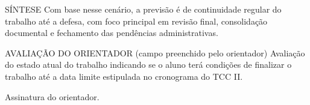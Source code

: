 \documentclass[12pt,a4paper]{article}
\begin{document}
\begin{sectionbox}{SÍNTESE}
Com base nesse cenário, a previsão é de continuidade regular do trabalho até a defesa, com foco principal em revisão final, consolidação documental e fechamento das pendências administrativas.
\end{sectionbox}

\begin{sectionbox}{AVALIAÇÃO DO ORIENTADOR (campo preenchido pelo orientador)}
Avaliação do estado atual do trabalho indicando se o aluno terá condições de finalizar o trabalho até a data limite estipulada no cronograma do TCC II.

\vspace{7cm}

\noindent
Assinatura do orientador.
\end{sectionbox}
\end{document}
